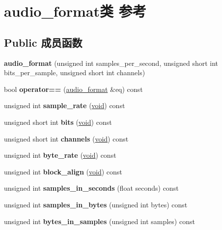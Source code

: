 \hypertarget{classaudio__format}{}\section{audio\+\_\+format类 参考}
\label{classaudio__format}
\subsection*{Public 成员函数}
\begin{DoxyCompactItemize}
\item 
\mbox{\label{classaudio__format_acddfa35d45c7c7c5c08a49120071bf1e}} 
{\bfseries audio\+\_\+format} (unsigned int samples\+\_\+per\+\_\+second, unsigned short int bits\+\_\+per\+\_\+sample, unsigned short int channels)
\item 
\mbox{\label{classaudio__format_a192d21d5bab206b145ba59f98923c566}} 
bool {\bfseries operator==} (\hyperlink{classaudio__format}{audio\+\_\+format} \&eq) const
\item 
\mbox{\label{classaudio__format_a9d24d32c148cc004cad577ffebc9535d}} 
unsigned int {\bfseries sample\+\_\+rate} (\hyperlink{interfacevoid}{void}) const
\item 
\mbox{\label{classaudio__format_a173dbc50f6498c6fb1cabd3a967fe82e}} 
unsigned short int {\bfseries bits} (\hyperlink{interfacevoid}{void}) const
\item 
\mbox{\label{classaudio__format_ad3b3cb0a0f410f2a8689a45d7b2e359c}} 
unsigned short int {\bfseries channels} (\hyperlink{interfacevoid}{void}) const
\item 
\mbox{\label{classaudio__format_a5020a10a472492b52d5c7574d10d8900}} 
unsigned int {\bfseries byte\+\_\+rate} (\hyperlink{interfacevoid}{void}) const
\item 
\mbox{\label{classaudio__format_ae5e35b20c9c541dda25e846d73dbdfdc}} 
unsigned int {\bfseries block\+\_\+align} (\hyperlink{interfacevoid}{void}) const
\item 
\mbox{\label{classaudio__format_a7ad2ae42006eb56f8604836a35de72dd}} 
unsigned int {\bfseries samples\+\_\+in\+\_\+seconds} (float seconds) const
\item 
\mbox{\label{classaudio__format_ac3f5a16424138ec9e57e6cf857ba73ba}} 
unsigned int {\bfseries samples\+\_\+in\+\_\+bytes} (unsigned int bytes) const
\item 
\mbox{\label{classaudio__format_a40839ec664ee67254d7b47663e2c9546}} 
unsigned int {\bfseries bytes\+\_\+in\+\_\+samples} (unsigned int samples) const
\end{DoxyCompactItemize}
